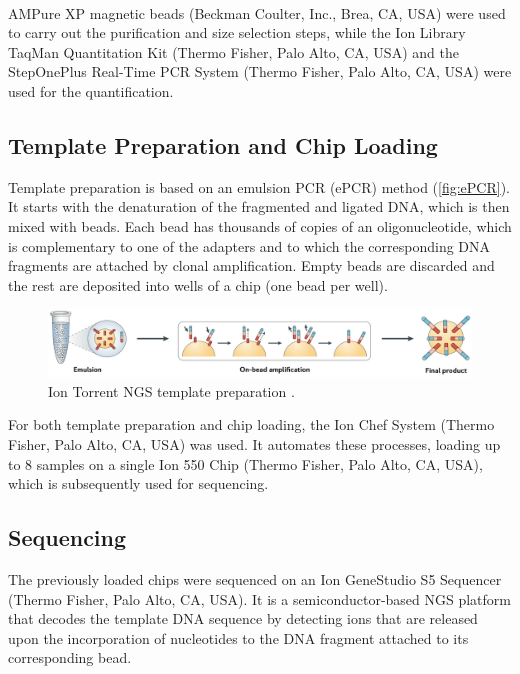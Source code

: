 AMPure XP\textsuperscript\textregistered{} magnetic beads (Beckman Coulter, Inc., Brea, CA, USA) were used to carry out the purification and size selection steps, while the Ion Library TaqMan\texttrademark{} Quantitation Kit (Thermo Fisher, Palo Alto, CA, USA) and the StepOnePlus\texttrademark{} Real-Time PCR System (Thermo Fisher, Palo Alto, CA, USA) were used for the quantification.

\subsection{Template Preparation and Chip Loading}

Template preparation is based on an emulsion PCR (ePCR) method (\autoref{fig:ePCR}). It starts with the denaturation of the fragmented and ligated DNA, which is then mixed with beads. Each bead has thousands of copies of an oligonucleotide, which is complementary to one of the adapters and to which the corresponding DNA fragments are attached by clonal amplification. Empty beads are discarded and the rest are deposited into wells of a chip (one bead per well).

\begin{figure}[ht]
    \centering
    \includegraphics[width=\textwidth]{Images/chapter_3/ePCR.png}
    \caption{Ion Torrent NGS template preparation \cite{NGS}.}
    \label{fig:ePCR}
\end{figure}

For both template preparation and chip loading, the Ion Chef\texttrademark{} System (Thermo Fisher, Palo Alto, CA, USA) was used. It automates these processes, loading up to 8 samples on a single Ion 550\texttrademark{} Chip (Thermo Fisher, Palo Alto, CA, USA), which is subsequently used for sequencing.

\subsection{Sequencing}

The previously loaded chips were sequenced on an Ion GeneStudio\texttrademark{} S5 Sequencer (Thermo Fisher, Palo Alto, CA, USA). It is a semiconductor-based NGS platform that decodes the template DNA sequence by detecting  ions that are released upon the incorporation of nucleotides to the DNA fragment attached to its corresponding bead. 

